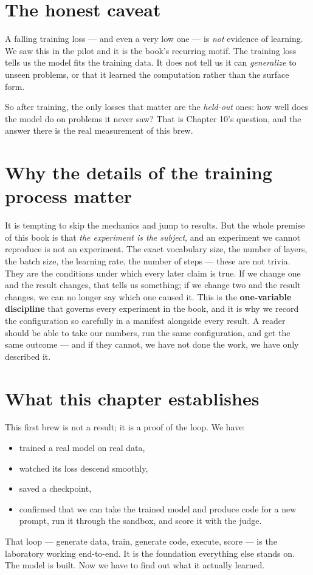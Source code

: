 \section{The honest caveat}\label{the-honest-caveat}

A falling training loss --- and even a very low one --- is \emph{not}
evidence of learning. We saw this in the pilot and it is the book's
recurring motif. The training loss tells us the model fits the training
data. It does not tell us it can \emph{generalize} to unseen problems,
or that it learned the computation rather than the surface form.

So after training, the only losses that matter are the \emph{held-out}
ones: how well does the model do on problems it never saw? That is
Chapter 10's question, and the answer there is the real measurement of
this brew.

\section{Why the details of the training process
matter}\label{why-the-details-of-the-training-process-matter}

It is tempting to skip the mechanics and jump to results. But the whole
premise of this book is that \emph{the experiment is the subject}, and
an experiment we cannot reproduce is not an experiment. The exact
vocabulary size, the number of layers, the batch size, the learning
rate, the number of steps --- these are not trivia. They are the
conditions under which every later claim is true. If we change one and
the result changes, that tells us something; if we change two and the
result changes, we can no longer say which one caused it. This is the
\textbf{one-variable discipline} that governs every experiment in the
book, and it is why we record the configuration so carefully in a
manifest alongside every result. A reader should be able to take our
numbers, run the same configuration, and get the same outcome --- and if
they cannot, we have not done the work, we have only described it.

\section{What this chapter
establishes}\label{what-this-chapter-establishes}

This first brew is not a result; it is a proof of the loop. We have:

\begin{itemize}
\tightlist
\item
  trained a real model on real data,
\item
  watched its loss descend smoothly,
\item
  saved a checkpoint,
\item
  confirmed that we can take the trained model and produce code for a
  new prompt, run it through the sandbox, and score it with the judge.
\end{itemize}

That loop --- generate data, train, generate code, execute, score --- is
the laboratory working end-to-end. It is the foundation everything else
stands on. The model is built. Now we have to find out what it actually
learned.
